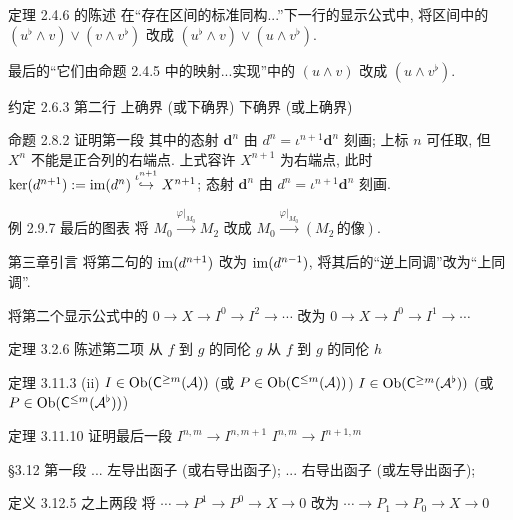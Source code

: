 \documentclass{AJerrata}
\begin{document}
\begin{Errata}
		\item[定理 2.4.6 的陈述]
		在``存在区间的标准同构...''下一行的显示公式中, 将区间中的 $(u^{\flat} \wedge v) \vee (v \wedge v^{\flat})$ 改成 $(u^{\flat} \wedge v) \vee (u \wedge v^{\flat})$.
		
		最后的``它们由命题 2.4.5 中的映射...实现''中的 $(u \wedge v)$ 改成 $(u \wedge v^{\flat})$.
		
		\item[约定 2.6.3 第二行]
		\Orig 上确界 (或下确界)
		\Corr 下确界 (或上确界)
		
		\item[命题 2.8.2 证明第一段]
		\Orig 其中的态射 $\mathbf{d}^n$ 由 $d^n = \iota^{n+1} \mathbf{d}^n$ 刻画; 上标 $n$ 可任取, 但 $X^n$ 不能是正合列的右端点.
		\Corr 上式容许 $X^{n+1}$ 为右端点, 此时 $\operatorname{ker}(d^{n+1}) := \operatorname{im}(d^n) \stackrel{\iota^{n+1}}{\hookrightarrow} X^{n+1}$; 态射 $\mathbf{d}^n$ 由 $d^n = \iota^{n+1} \mathbf{d}^n$ 刻画.
		
		\item[例 2.9.7 最后的图表] 将 $M_0 \xrightarrow{\varphi|_{M_0}} M_2$ 改成 $M_0 \xrightarrow{\varphi|_{M_0}} (M_2\,\text{的像})$.
		
		\item[第三章引言]
		将第二句的 $\operatorname{im}(d^{n+1})$ 改为 $\operatorname{im}(d^{n-1})$, 将其后的``逆上同调''改为``上同调''.
		
		将第二个显示公式中的 $0 \to X \to I^0 \to I^2 \to \cdots$ 改为 $0 \to X \to I^0 \to I^1 \to \cdots$
		
		\item[定理 3.2.6 陈述第二项]
		\Orig 从 $f$ 到 $g$ 的同伦 $g$
		\Corr 从 $f$ 到 $g$ 的同伦 $h$
		
		\item[定理 3.11.3 (ii)]
		\Orig $I \in \operatorname{Ob}(\mathsf{C}^{\geq m}(\mathcal{A}))$ (或 $P \in \operatorname{Ob}(\mathsf{C}^{\leq m}(\mathcal{A}))$)
		\Corr $I \in \operatorname{Ob}(\mathsf{C}^{\geq m}(\mathcal{A}^\flat))$ (或 $P \in \operatorname{Ob}(\mathsf{C}^{\leq m}(\mathcal{A}^\flat))$)
		
		\item[定理 3.11.10 证明最后一段]
		\Orig $I^{n,m} \to I^{n,m+1}$
		\Corr $I^{n,m} \to I^{n+1,m}$
		
		\item[\S 3.12 第一段]
		\Orig ... 左导出函子 (或右导出函子);
		\Corr ... 右导出函子 (或左导出函子);
		
		\item[定义 3.12.5 之上两段]
		将 $\cdots \to P^1 \to P^0 \to X \to 0$ 改为 $\cdots \to P_1 \to P_0 \to X \to 0$
		

\end{Errata}
\end{document}
